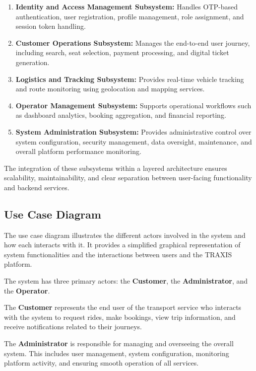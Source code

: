 \begin{enumerate}
    \item \textbf{Identity and Access Management Subsystem:} Handles OTP-based authentication, user registration, profile management, role assignment, and session token handling.

    \item \textbf{Customer Operations Subsystem:} Manages the end-to-end user journey, including search, seat selection, payment processing, and digital ticket generation.

    \item \textbf{Logistics and Tracking Subsystem:} Provides real-time vehicle tracking and route monitoring using geolocation and mapping services.

    \item \textbf{Operator Management Subsystem:} Supports operational workflows such as dashboard analytics, booking aggregation, and financial reporting.

    \item \textbf{System Administration Subsystem:} Provides administrative control over system configuration, security management, data oversight, maintenance, and overall platform performance monitoring.
\end{enumerate}

The integration of these subsystems within a layered architecture ensures scalability, maintainability, and clear separation between user-facing functionality and backend services.

\subsection{Use Case Diagram}

The use case diagram illustrates the different actors involved in the system and how each interacts with it. It provides a simplified graphical representation of system functionalities and the interactions between users and the TRAXIS platform.

The system has three primary actors: the \textbf{Customer}, the \textbf{Administrator}, and the \textbf{Operator}.

The \textbf{Customer} represents the end user of the transport service who interacts with the system to request rides, make bookings, view trip information, and receive notifications related to their journeys.

The \textbf{Administrator} is responsible for managing and overseeing the overall system. This includes user management, system configuration, monitoring platform activity, and ensuring smooth operation of all services.

